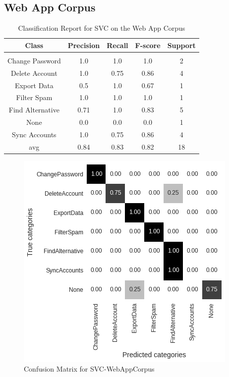 \documentclass[11pt, oneside]{article}   	%
\begin{document}
\newpage
\subsection{Web App Corpus}

\begin{table}[h]
\centering
\caption{Classification Report for SVC on the Web App Corpus}
\begin{tabular}{c | c c c c}
Class & Precision & Recall & F-score & Support\\
\hline
\hline\\
Change Password & 1.0 & 1.0 & 1.0 & 2\\
Delete Account & 1.0 & 0.75 & 0.86 & 4\\
Export Data & 0.5 & 1.0 & 0.67 & 1\\
Filter Spam & 1.0 & 1.0 & 1.0 & 1\\
Find Alternative & 0.71 & 1.0 & 0.83 & 5\\
None & 0.0 & 0.0 & 0.0 & 1\\
Sync Accounts & 1.0 & 0.75 & 0.86 & 4\\
avg & 0.84 & 0.83 & 0.82 & 18\\
\end{tabular}
\end{table}

\begin{figure}[h]
\centering
\includegraphics[width=0.5\linewidth]{SVC-WebAppCorpus}
\caption{Confusion Matrix for SVC-WebAppCorpus}
\label{fig:SVC-WebAppCorpus}
\end{figure}
\end{document}
